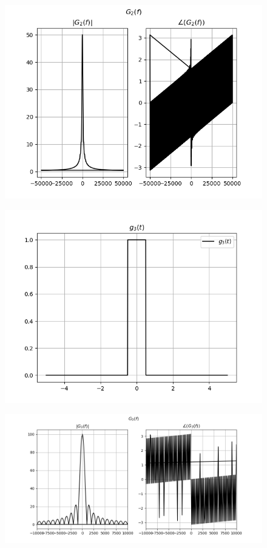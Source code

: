 \documentclass[journal,12pt,twocolumn]{IEEEtran}
\begin{document}
\begin{figure}[!ht]
\centering
 \includegraphics[width=\columnwidth]{graphs/fourier_g2.png}
\end{figure}    
    
    
\begin{figure}[!ht]
\centering
 \includegraphics[width=\columnwidth]{graphs/g3.png}
\end{figure}

\begin{figure}[!ht]
\centering
 \includegraphics[width=\columnwidth]{graphs/fourier_g3.png}
\end{figure}
    
    
\end{document}
